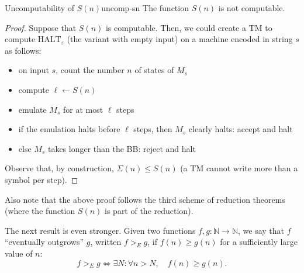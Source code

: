 \begin{theorem}{Uncomputability of \(S(n)\)}{uncomp-sn}
    The function \(S(n)\) is not computable.
    \begin{proof}
        Suppose that \(S(n)\) is computable. Then, we could create a TM to compute \(\text{HALT}_\varepsilon\) (the variant with empty input) on a machine encoded in string \(s\) as follows:
        \begin{itemize}
            \item on input \(s\), count the number \(n\) of states of \(M_s\)
            \item compute \(\ell \leftarrow S(n)\)
            \item emulate \(M_s\) for at most \(\ell\) steps
            \item if the emulation halts before \(\ell\) steps, then \(M_s\) clearly halts: accept and halt
            \item else \(M_s\) takes longer than the BB: reject and halt
        \end{itemize}
        Observe that, by construction, \(\Sigma(n) \le S(n)\) (a TM cannot write more than a symbol per step).
    \end{proof}
\end{theorem}

\noindent Also note that the above proof follows the third scheme of reduction theorems (where the function \(S(n)\) is part of the reduction). 

The next result is even stronger. Given two functions \(f, g : \mathbb{N} \rightarrow \mathbb{N}\), we say that \(f\) ``eventually outgrows'' \(g\), written \(f >_E g\), if \(f(n) \ge g(n)\) for a sufficiently large value of \(n\):
\[
f >_E g \iff \exists N : \forall n > N, \quad f(n) \ge g(n).
\]


